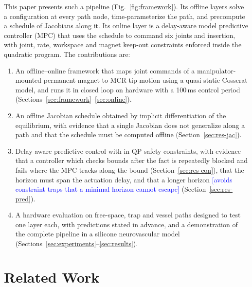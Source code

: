 \documentclass[journal]{IEEEtran}
\newcommand{\NEWRUN}[1]{\textcolor{blue}{[#1]}}
\begin{document}
This paper presents such a pipeline (Fig.~\ref{fig:framework}). Its
offline layers solve a configuration at every path node, time-parameterize
the path, and precompute a schedule of Jacobians along it. Its online layer
is a delay-aware model predictive controller (MPC) that uses the schedule
to command six joints and insertion, with joint, rate, workspace and
magnet keep-out constraints enforced inside the quadratic program. The
contributions are:
\begin{enumerate}
\item An offline--online framework that maps joint commands of a
manipulator-mounted permanent magnet to MCR tip motion using a
quasi-static Cosserat model, and runs it in closed loop on hardware with
a 100\,ms control period (Sections~\ref{sec:framework}--\ref{sec:online}).
\item An offline Jacobian schedule obtained by implicit differentiation of
the equilibrium, with evidence that a single Jacobian does not generalize
along a path and that the schedule must be computed offline
(Section~\ref{sec:res-jac}).
\item Delay-aware predictive control with in-QP safety constraints, with
evidence that a controller which checks bounds after the fact is
repeatedly blocked and fails where the MPC tracks along the bound
(Section~\ref{sec:res-con}), that the horizon must span the actuation
delay, and that a longer horizon \NEWRUN{avoids constraint traps that a
minimal horizon cannot escape} (Section~\ref{sec:res-pred}).
\item A hardware evaluation on free-space, trap and vessel paths designed
to test one layer each, with predictions stated in advance, and a
demonstration of the complete pipeline in a silicone neurovascular model
(Sections~\ref{sec:experiments}--\ref{sec:results}).
\end{enumerate}

\section{Related Work}
\label{sec:related}
\end{document}
